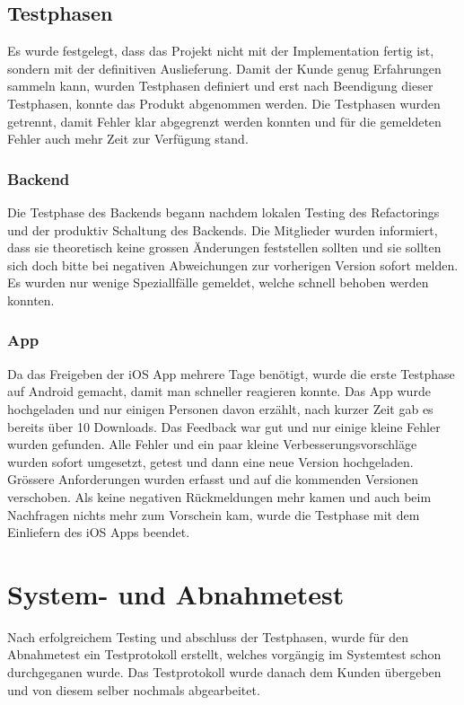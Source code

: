 \subsection{Testphasen}
Es wurde festgelegt, dass das Projekt nicht mit der Implementation fertig ist, sondern mit der definitiven Auslieferung. Damit der Kunde genug Erfahrungen sammeln kann, wurden Testphasen definiert und erst nach Beendigung dieser Testphasen, konnte das Produkt abgenommen werden. Die Testphasen wurden getrennt, damit Fehler klar abgegrenzt werden konnten und für die gemeldeten Fehler auch mehr Zeit zur Verfügung stand.

\subsubsection{Backend}
Die Testphase des Backends begann nachdem lokalen Testing des Refactorings und der produktiv Schaltung des Backends. Die Mitglieder wurden informiert, dass sie theoretisch keine grossen Änderungen feststellen sollten und sie sollten sich doch bitte bei negativen Abweichungen zur vorherigen Version sofort melden. Es wurden nur wenige Speziallfälle gemeldet, welche schnell behoben werden konnten.

\subsubsection{App}
Da das Freigeben der iOS App mehrere Tage benötigt, wurde die erste Testphase auf Android gemacht, damit man schneller reagieren konnte. Das App wurde hochgeladen und nur einigen Personen davon erzählt, nach kurzer Zeit gab es bereits über 10 Downloads. Das Feedback war gut und nur einige kleine Fehler wurden gefunden. Alle Fehler und ein paar kleine Verbesserungsvorschläge wurden sofort umgesetzt, getest und dann eine neue Version hochgeladen. Grössere Anforderungen wurden erfasst und auf die kommenden Versionen verschoben. Als keine negativen Rückmeldungen mehr kamen und auch beim Nachfragen nichts mehr zum Vorschein kam, wurde die Testphase mit dem Einliefern des iOS Apps beendet.

\section{System- und Abnahmetest}
Nach erfolgreichem Testing und abschluss der Testphasen, wurde für den Abnahmetest ein Testprotokoll erstellt, welches vorgängig im Systemtest schon durchgeganen wurde. Das Testprotokoll wurde danach dem Kunden übergeben und von diesem selber nochmals abgearbeitet.

